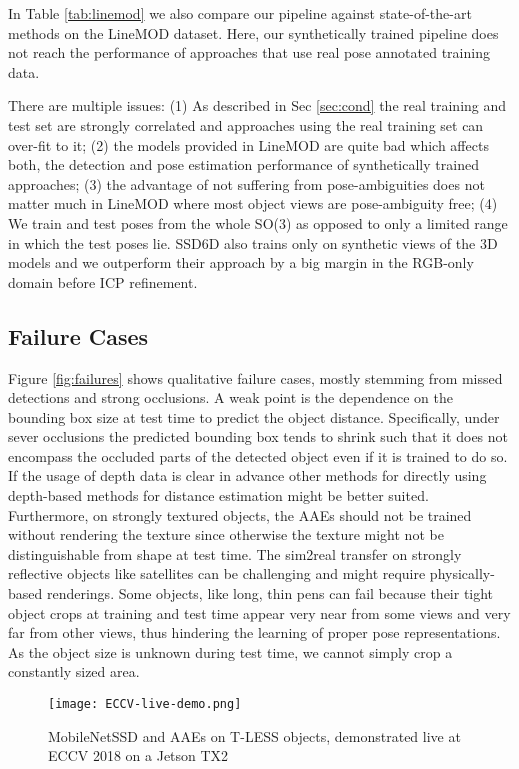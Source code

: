 {{	In Table \ref{tab:linemod} we also compare our pipeline against state-of-the-art methods on the LineMOD dataset. Here, our synthetically trained pipeline does not reach the performance of approaches that use real pose annotated training data. 
	
	
	There are multiple issues: (1) As described in Sec \ref{sec:cond} the real training and test set are strongly correlated and approaches using the real training set can over-fit to it; (2) the models provided in LineMOD are quite bad which affects both, the detection and pose estimation performance of synthetically trained approaches; (3) the advantage of not suffering from pose-ambiguities does not matter much in LineMOD where most object views are pose-ambiguity free; (4) We train and test poses from the whole SO(3) as opposed to only a limited range in which the test poses lie.
	SSD6D also trains only on synthetic views of the 3D models and we outperform their approach by a big margin in the RGB-only domain before \gls{ICP} refinement. 
	
	\subsection{Failure Cases}
	Figure \ref{fig:failures} shows qualitative failure cases, mostly stemming from missed detections and strong occlusions. A weak point is the dependence on the bounding box size at test time to predict the object distance. Specifically, under sever occlusions the predicted bounding box tends to shrink such that it does not encompass the occluded parts of the detected object even if it is trained to do so.
	If the usage of depth data is clear in advance other methods for directly using depth-based methods for distance estimation might be better suited. Furthermore, on strongly textured objects, the AAEs should not be trained without rendering the texture since otherwise the texture might not be distinguishable from shape at test time. The sim2real transfer on strongly reflective objects like satellites can be challenging and might require physically-based renderings.
	Some objects, like long, thin pens can fail because their tight object crops at training and test time appear very near from some views and very far from other views, thus hindering the learning of proper pose representations. As the object size is unknown during test time, we cannot simply crop a constantly sized area. 
	

\begin{figure}[t]\centering
	\captionsetup{width=0.99\columnwidth}
	\texttt{[image: ECCV-live-demo.png]}
	\caption{MobileNetSSD and \glspl{AAE} on T-LESS objects, demonstrated live at ECCV 2018 on a Jetson TX2}
	\label{fig:ECCV-live-demo}
\end{figure}

}}
